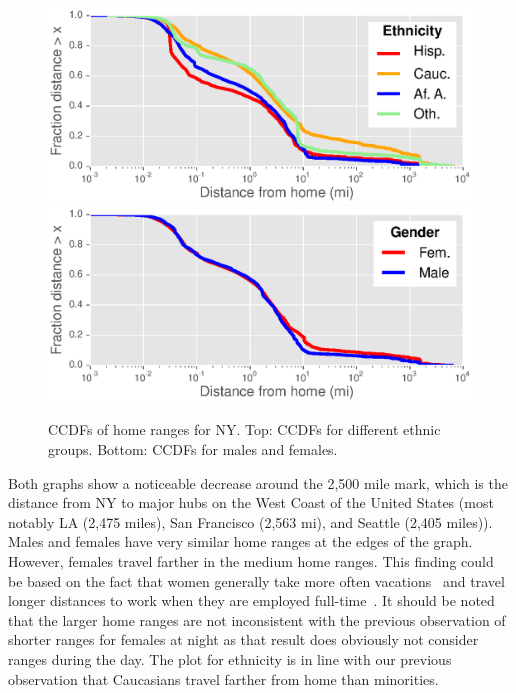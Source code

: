 \begin{figure}[h]
  \centering
  \includegraphics[width=\linewidth]{fig/footprints/distance_ccdf_eth_wide.eps}
  \includegraphics[width=\linewidth]{fig/footprints/distance_ccdf_gender_wide.eps}
  \caption{CCDFs of home ranges for NY. Top: CCDFs for different ethnic groups. Bottom: CCDFs for males and females.}
  \label{fig:checkin_distance}
\end{figure}

Both graphs show a noticeable decrease around the 2,500 mile mark, which is the distance from NY to major hubs on the West Coast of the United States (most notably LA (2,475 miles), San Francisco (2,563 mi), and Seattle (2,405 miles)). Males and females have very similar home ranges at the edges of the graph. However, females travel farther in the medium home ranges. This finding could be based on the fact that women generally take more often vacations~\cite{kelton:2013} and travel longer distances to work when they are employed full-time~\cite{kwan:1999}. It should be noted that the larger home ranges are not inconsistent with the previous observation of shorter ranges for females at night as that result does obviously not consider ranges during the day. The plot for ethnicity is in line with our previous observation that Caucasians travel farther from home than minorities.

